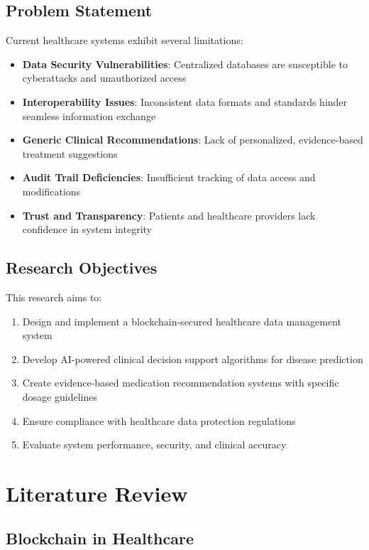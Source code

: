 \documentclass[12pt,a4paper]{article}
\begin{document}
\subsection{Problem Statement}

Current healthcare systems exhibit several limitations:
\begin{itemize}
    \item \textbf{Data Security Vulnerabilities}: Centralized databases are susceptible to cyberattacks and unauthorized access
    \item \textbf{Interoperability Issues}: Inconsistent data formats and standards hinder seamless information exchange
    \item \textbf{Generic Clinical Recommendations}: Lack of personalized, evidence-based treatment suggestions
    \item \textbf{Audit Trail Deficiencies}: Insufficient tracking of data access and modifications
    \item \textbf{Trust and Transparency}: Patients and healthcare providers lack confidence in system integrity
\end{itemize}

\subsection{Research Objectives}

This research aims to:
\begin{enumerate}
    \item Design and implement a blockchain-secured healthcare data management system
    \item Develop AI-powered clinical decision support algorithms for disease prediction
    \item Create evidence-based medication recommendation systems with specific dosage guidelines
    \item Ensure compliance with healthcare data protection regulations
    \item Evaluate system performance, security, and clinical accuracy
\end{enumerate}

\section{Literature Review}

\subsection{Blockchain in Healthcare}
\end{document}
